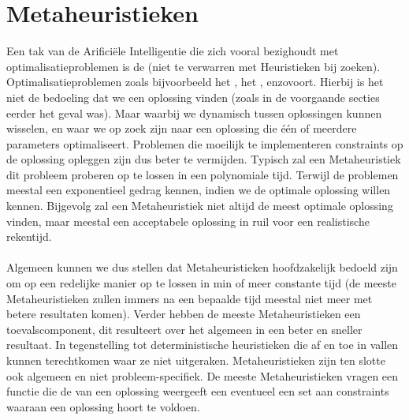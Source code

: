 \section{Metaheuristieken}
\label{s:metaheuristics}
Een tak van de Arifici\"ele Intelligentie die zich vooral bezighoudt met optimalisatieproblemen is de  (niet te verwarren met Heuristieken bij zoeken). Optimalisatieproblemen zoals bijvoorbeeld het , het , enzovoort. Hierbij is het niet de bedoeling dat we een oplossing vinden (zoals in de voorgaande secties eerder het geval was). Maar waarbij we dynamisch tussen oplossingen kunnen wisselen, en waar we op zoek zijn naar een oplossing die \'e\'en of meerdere parameters optimaliseert. Problemen die moeilijk te implementeren constraints op de oplossing opleggen zijn dus beter te vermijden. Typisch  zal een Metaheuristiek dit probleem proberen op te lossen in een polynomiale tijd. Terwijl de problemen meestal een exponentieel gedrag kennen, indien we de optimale oplossing willen kennen. Bijgevolg zal een Metaheuristiek niet altijd de meest optimale oplossing vinden, maar meestal een acceptabele oplossing in ruil voor een realistische rekentijd.
\paragraph{}
Algemeen kunnen we dus stellen dat Metaheuristieken hoofdzakelijk bedoeld zijn om  op een redelijke manier op te lossen in min of meer constante tijd (de meeste Metaheuristieken zullen immers na een bepaalde tijd meestal niet meer met betere resultaten komen). Verder hebben de meeste Metaheuristieken een toevalscomponent, dit  resulteert over het algemeen in een beter en sneller resultaat. In tegenstelling tot deterministische heuristieken die af en toe in vallen kunnen terechtkomen waar ze niet uitgeraken. Metaheuristieken zijn ten slotte ook algemeen en niet probleem-specifiek. De meeste Metaheuristieken vragen een functie die de  van een oplossing weergeeft een eventueel een set aan constraints waaraan een oplossing hoort te voldoen.
